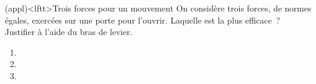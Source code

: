 \documentclass[../../main/main.tex]{subfiles}
\begin{document}
\begin{tcb*}[sidebyside](appl)<lftt>{Trois forces pour un mouvement}
	On considère trois forces, de normes égales, exercées sur une porte pour
	l'ouvrir. Laquelle est la plus efficace~? Justifier à l'aide du bras de
	levier.
	\smallbreak
	\begin{enumerate}
		\item {}
		      \vspace{-15pt}
		\item {}
		      \vspace{-15pt}
		\item {}
		      \vspace{-15pt}
	\end{enumerate}
	\tcblower
	\begin{center}
\end{center}
\end{tcb*}
\end{document}
